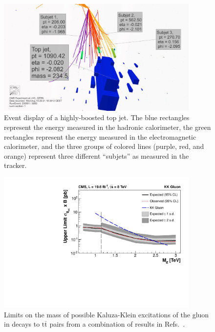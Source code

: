 \documentclass[12pt]{proposalnsf}
\newcommand{\ttbar}        {\ensuremath{\mathrm{t}\overline{\mathrm{t}}}}
\begin{document}
\begin{figure}[h!]
    \centering
    \includegraphics[width=100mm]{topjet_rechits_white}
    \caption{\label{boostedtop_eventdisplay} Event display of a
      highly-boosted top jet. The blue rectangles represent the
      energy measured in the hadronic calorimeter, the green
      rectangles represent the energy measured in the electromagnetic
      calorimeter, and the three groups of colored lines (purple, red,
      and orange) represent three different ``subjets'' as measured in
      the tracker.}
\end{figure}



\begin{figure}[h!]
    \centering
    \includegraphics[width=100mm]{limits-kk_combined}
    \caption{\label{fig:limits-kk_combined}Limits on the mass of
      possible Kaluza-Klein excitations of the gluon in decays to
      $\ttbar$ pairs from a combination of results in
      Refs.~\cite{B2G-12-005,B2G-12-006}. }
\end{figure}
\end{document}
